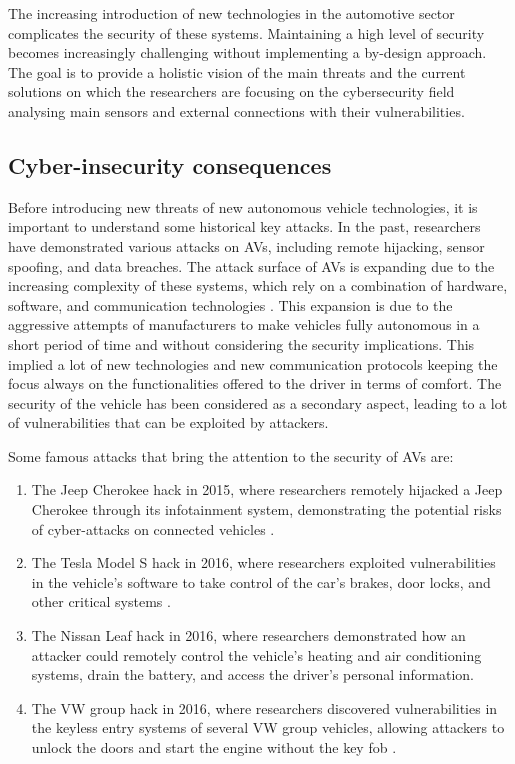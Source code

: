 The increasing introduction of new technologies in the automotive sector complicates the security of these systems.
Maintaining a high level of security becomes increasingly challenging without implementing a by-design approach.
The goal is to provide a holistic vision of the main threats and the current solutions on which the researchers are focusing on the cybersecurity field analysing main sensors and external connections with their vulnerabilities.


\subsection{Cyber-insecurity consequences}\label{subsec:cyber-insecurity}

Before introducing new threats of new autonomous vehicle technologies, it is important to understand some historical key attacks.
In the past, researchers have demonstrated various attacks on AVs, including remote hijacking, sensor spoofing, and data breaches.
The attack surface of AVs is expanding due to the increasing complexity of these systems, which rely on a combination of hardware, software, and communication technologies \cite{cybersec}.
This expansion is due to the aggressive attempts of manufacturers to
make vehicles fully autonomous in a short period of time and without considering the security implications.
This implied a lot of new technologies and new communication protocols keeping the focus always on the functionalities offered to the driver in terms of comfort.
The security of the vehicle has been considered as a secondary aspect, leading to a lot of vulnerabilities that can be exploited by attackers.

Some famous attacks that bring the attention to the security of AVs are:
\begin{enumerate}
    \item The Jeep Cherokee hack in 2015, where researchers remotely hijacked a Jeep Cherokee through its infotainment system, demonstrating the potential risks of cyber-attacks on connected vehicles \cite{miller2015remote} .
    \item The Tesla Model S hack in 2016, where researchers exploited vulnerabilities in the vehicle's software to take control of the car's brakes, door locks, and other critical systems \cite{tesla_hack}.
    \item The Nissan Leaf hack in 2016, where researchers demonstrated how an attacker could remotely control the vehicle's heating and air conditioning systems, drain the battery, and access the driver's personal information.
    \item The VW group hack in 2016, where researchers discovered vulnerabilities in the keyless entry systems of several VW group vehicles, allowing attackers to unlock the doors and start the engine without the key fob \cite{garcia2016lock}.
\end{enumerate}


